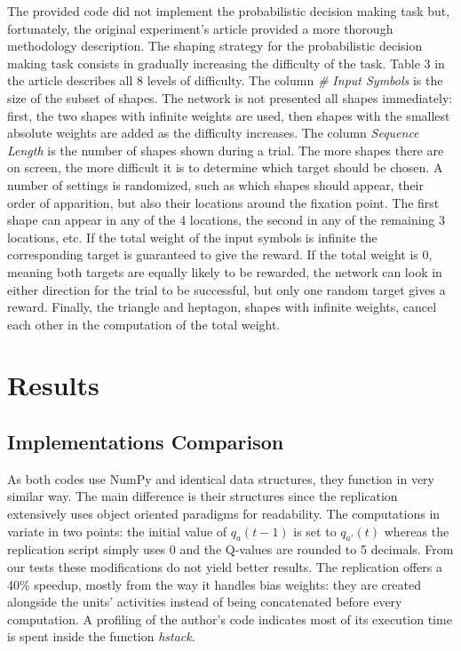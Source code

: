 \documentclass[10pt,a4paper,onecolumn]{article}
\begin{document}
The provided code did not implement the probabilistic decision making
task but, fortunately, the original experiment's article
\autocite{yang:2007} provided a more thorough methodology description.
The shaping strategy for the probabilistic decision making task consists
in gradually increasing the difficulty of the task. Table 3 in the
article describes all 8 levels of difficulty. The column \emph{\# Input
Symbols} is the size of the subset of shapes. The network is not
presented all shapes immediately: first, the two shapes with infinite
weights are used, then shapes with the smallest absolute weights are
added as the difficulty increases. The column \emph{Sequence Length} is
the number of shapes shown during a trial. The more shapes there are on
screen, the more difficult it is to determine which target should be
chosen. A number of settings is randomized, such as which shapes should
appear, their order of apparition, but also their locations around the
fixation point. The first shape can appear in any of the 4 locations,
the second in any of the remaining 3 locations, etc. If the total weight
of the input symbols is infinite the corresponding target is guaranteed
to give the reward. If the total weight is 0, meaning both targets are
equally likely to be rewarded, the network can look in either direction
for the trial to be successful, but only one random target gives a
reward. Finally, the triangle and heptagon, shapes with infinite
weights, cancel each other in the computation of the total weight.

\section{Results}\label{results}

\subsection{Implementations
Comparison}\label{implementations-comparison}

As both codes use NumPy and identical data structures, they function in
very similar way. The main difference is their structures since the
replication extensively uses object oriented paradigms for readability.
The computations in \autocite{rombouts:github} variate in two points:
the initial value of \(q_{a}(t-1)\) is set to \(q_{a'}(t)\) whereas the
replication script simply uses 0 and the Q-values are rounded to 5
decimals. From our tests these modifications do not yield better
results. The replication offers a 40\% speedup, mostly from the way it
handles bias weights: they are created alongside the units' activities
instead of being concatenated before every computation. A profiling of
the author's code indicates most of its execution time is spent inside
the function \emph{hstack}.
\end{document}
